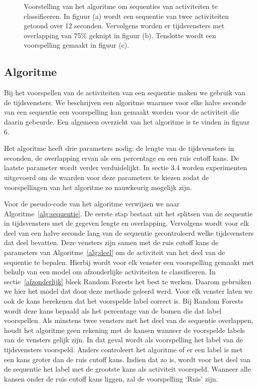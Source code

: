 \documentclass{article}
\begin{document}
\begin{figure}[h]
\begin{subfigure}[b]{.90\linewidth}
\end{subfigure}
  \caption{Voorstelling van het algoritme om sequenties van activiteiten te classificeren. In figuur (a) wordt een sequentie van twee activiteiten getoond over 12 seconden. Vervolgens worden er tijdsvensters met overlapping van 75\% geknipt in figuur (b). Tenslotte wordt een voorspelling gemaakt in figuur (c).}\label{fig:algoritme}

\end{figure}

\subsection{Algoritme}

Bij het voorspellen van de activiteiten van een sequentie maken we gebruik van de tijdsvensters. We beschrijven een algoritme waarmee voor elke halve seconde van een sequentie een voorspelling kan gemaakt worden voor de activiteit die daarin gebeurde. Een algemeen overzicht van het algoritme is te vinden in figuur 6.

Het algoritme heeft drie parameters nodig: de lengte van de tijdsvensters in seconden, de overlapping ervan als een percentage en een ruis cutoff kans. De laatste parameter wordt verder verduidelijkt. In sectie 3.4 worden experimenten uitgevoerd om de waarden voor deze parameters te kiezen zodat de voorspellingen van het algoritme zo nauwkeurig mogelijk zijn.

Voor de pseudo-code van het algoritme verwijzen we naar Algoritme~\ref{alg:sequentie}. De eerste stap bestaat uit het splitsen van de sequentie in tijdsvensters met de gegeven lengte en overlapping. Vervolgens wordt voor elk deel van een halve seconde lang van de sequentie gecontroleerd welke tijdsvensters dat deel bevatten. Deze vensters zijn samen met de ruis cutoff kans de parameters van Algoritme~\ref{alg:deel} om de activiteit van het deel van de sequentie te bepalen. Hierbij wordt voor elk venster een voorspelling gemaakt met behulp van een model om afzonderlijke activiteiten te classificeren. In sectie~\ref{afzonderlijk} bleek Random Forests het best te werken. Daarom gebruiken we hier het model dat door deze methode geleerd werd. Voor elk venster laten we ook de kans berekenen dat het voorspelde label correct is. Bij Random Forests wordt deze kans bepaald als het percentage van de bomen die dat label voorspellen. %
Als minstens twee vensters met het deel van de sequentie overlappen, houdt het algoritme geen rekening met de kansen wanneer de voorspelde labels van de vensters gelijk zijn. In dat geval wordt als voorspelling het label van de tijdsvensters voorspeld. Anders controleert het algoritme of er een label is met een kans groter dan de ruis cutoff kans. Indien dat zo is, wordt voor het deel van de sequentie het label met de grootste kans als activiteit voorspeld. Wanneer alle kansen onder de ruis cutoff kans liggen, zal de voorspelling `Ruis' zijn.
\end{document}

